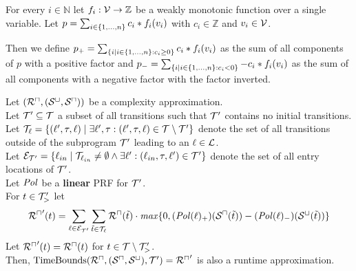 \begin{definition}
  For every $i \in \mathbb{N}$ let $f_i: \mathcal{V} \rightarrow \mathbb{Z}$ be a weakly monotonic function over a single variable.
  Let $p = \sum_{i \in \lbrace 1, \dots, n \rbrace} c_i * f_i(v_i)$ with $c_i \in \mathbb{Z}$ and $v_i \in \mathcal{V}$.

  Then we define $p_+ = \sum_{\lbrace i \mid i \in \lbrace 1, \dots, n \rbrace: c_i \geq 0 \rbrace} c_i * f_i(v_i)$ as the sum of all components of $p$ with a positive factor and $p_- = \sum_{\lbrace i \mid i \in \lbrace 1, \dots, n \rbrace: c_i < 0 \rbrace} -c_i * f_i(v_i)$ as the sum of all components with a negative factor with the factor inverted.
\end{definition}

\begin{theorem}[TimeBounds]
  Let $({\mathcal{R}^\sqcap}, {({\mathcal{S}^\sqcup}, {\mathcal{S}^\sqcap})})$ be a complexity approximation. \\
  Let $\mathcal{T}' \subseteq \mathcal{T}$ a subset of all transitions such that $\mathcal{T}'$ contains no initial transitions. \\
  Let $\mathcal{T}_{\ell} = \lbrace (\ell', \tau, \ell) \mid \exists \ell', \tau: (\ell', \tau, \ell) \in \mathcal{T} \setminus \mathcal{T}' \rbrace$ denote the set of all transitions outside of the subprogram $\mathcal{T}'$ leading to an $\ell \in \mathcal{L}$. \\
  Let $\mathcal{E}_{\mathcal{T}'} = \lbrace \ell_{in} \mid \mathcal{T}_{\ell_{in}} \neq \emptyset \wedge \exists \ell': (\ell_{in}, \tau, \ell') \in \mathcal{T}' \rbrace$ denote the set of all entry locations of $\mathcal{T}'$. \\
  Let $\mathit{Pol}$ be a \textbf{linear} PRF for $\mathcal{T}'$. \\
  For $t \in \mathcal{T}'_>$ let
  \[ {\mathcal{R}^\sqcap}'(t) = \sum_{\ell \in \mathcal{E}_{\mathcal{T}'}} \sum_{\tilde{t} \in \mathcal{T}_\ell} {\mathcal{R}^\sqcap}(\tilde{t}) \cdot \mathit{max} \lbrace 0, (\mathit{Pol}(\ell)_+)({\mathcal{S}^\sqcap}(\tilde{t})) - (\mathit{Pol}(\ell)_-)({\mathcal{S}^\sqcup}(\tilde{t})) \rbrace \]
  Let ${\mathcal{R}^\sqcap}'(t) = {\mathcal{R}^\sqcap}(t)$ for $t \in \mathcal{T} \setminus \mathcal{T}'_>$. \\
  Then, $\text{TimeBounds}({\mathcal{R}^\sqcap}, ({\mathcal{S}^\sqcap}, {\mathcal{S}^\sqcup}), \mathcal{T}') = {\mathcal{R}^\sqcap}'$ is also a runtime approximation.
\end{theorem}
